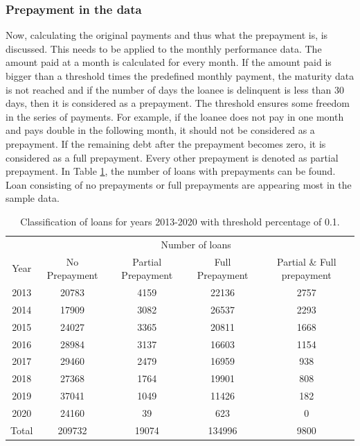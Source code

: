     \subsubsection{Prepayment in the data}
        Now, calculating the original payments and thus what the prepayment is, is discussed. This needs to be applied to the monthly performance data. The amount paid at a month is calculated for every month. If the amount paid is bigger than a threshold times the predefined monthly payment, the maturity data is not reached and if the number of days the loanee is delinquent is less than 30 days, then it is considered as a prepayment. The threshold ensures some freedom in the series of payments. For example, if the loanee does not pay in one month and pays double in the following month, it should not be considered as a prepayment. If the remaining debt after the prepayment becomes zero, it is considered as a full prepayment. Every other prepayment is denoted as partial prepayment. In Table \ref{model_classficationprepayment_table}, the number of loans with prepayments can be found. Loan consisting of no prepayments or full prepayments are appearing most in the sample data. 
        \begin{table}[H]
        \centering
            \begin{tabular}{c|c|c|c|c}
                & \multicolumn{4}{c}{Number of loans} \\
                Year&No Prepayment&Partial Prepayment&Full Prepayment&Partial \& Full prepayment  \\\hline
                2013 & 20783 & 4159 & 22136 & 2757\\
                2014 & 17909 & 3082 & 26537 & 2293\\
                2015 & 24027 & 3365 & 20811 & 1668 \\
                2016 & 28984 & 3137 & 16603 & 1154 \\
                2017 & 29460 & 2479 & 16959 & 938 \\
                2018 & 27368 & 1764 & 19901 & 808 \\
                2019 & 37041 & 1049 & 11426 & 182 \\
                2020 & 24160 & 39 & 623 & 0 \\\hline
                Total & 209732 & 19074 & 134996 & 9800
		    \end{tabular}
		    \caption{Classification of loans for years 2013-2020 with threshold percentage of 0.1.}
		    \label{model_classficationprepayment_table}
        \end{table}

